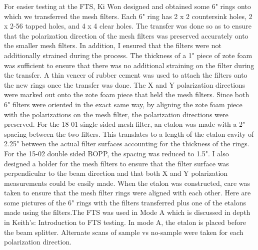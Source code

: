 \documentclass[12pt]{article}
\begin{document}
For easier testing at the FTS, Ki Won designed and obtained some 6" rings onto which we transferred the mesh filters. Each 6" ring has 2 x 2 countersink holes, 2 x 2-56 tapped holes, and 4 x 4 clear holes. The transfer was done so as to ensure that the polarization direction of the mesh filters was preserved accurately onto the smaller mesh filters. In addition, I ensured that the filters were not additionally strained during the process. The thickness of a 1" piece of zote foam was sufficient to ensure that there was no additional straining on the filter during the transfer. A thin veneer of rubber cement was used to attach the filters onto the new rings once the transfer was done. The X and Y polarization directions were marked out onto the zote foam piece that held the mesh filters. Since both 6" filters were oriented in the exact same way, by aligning the zote foam piece with the polarizations on the mesh filter, the polarization directions were preserved.
For the 18-01 single sided mesh filter, an etalon was made with a 2" spacing between the two filters. This translates to a length of the etalon cavity of 2.25" between the actual filter surfaces accounting for the thickness of the rings. For the 15-02 double sided BOPP, the spacing was reduced to 1.5". I also designed a holder for the mesh filters to ensure that the filter surface was perpendicular to the beam direction and that both X and Y polarization measurements could be easily made. When the etalon was constructed, care was taken to ensure that the mesh filter rings were aligned with each other. Here are some pictures of the 6" rings with the filters transferred plus one of the etalons made using the filters.The FTS was used in Mode A which is discussed in depth in Keith's: Introduction to FTS testing. In mode A, the etalon is placed before the beam splitter. Alternate scans of sample vs no-sample were taken for each polarization direction.
\end{document}
